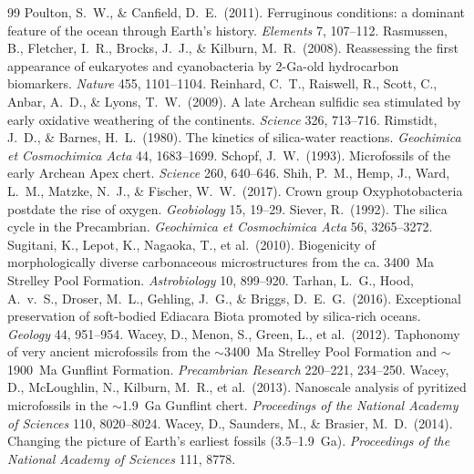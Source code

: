 \documentclass[11pt]{article}
\begin{document}
\begin{thebibliography}{99}
 Poulton, S.~W., \& Canfield, D.~E.\ (2011).
Ferruginous conditions: a dominant feature of the ocean through Earth's history. \textit{Elements} 7,
107--112.
 Rasmussen, B., Fletcher, I.~R., Brocks, J.~J., \&
Kilburn, M.~R.\ (2008). Reassessing the first appearance of eukaryotes and cyanobacteria by
2-Ga-old hydrocarbon biomarkers. \textit{Nature} 455, 1101--1104.
 Reinhard, C.~T., Raiswell, R., Scott, C., Anbar, A.~D.,
\& Lyons, T.~W.\ (2009). A late Archean sulfidic sea stimulated by early oxidative weathering of the
continents. \textit{Science} 326, 713--716.
 Rimstidt, J.~D., \& Barnes, H.~L.\ (1980). The
kinetics of silica-water reactions. \textit{Geochimica et Cosmochimica Acta} 44, 1683--1699.
 Schopf, J.~W.\ (1993). Microfossils of the early Archean Apex
chert. \textit{Science} 260, 640--646.
 Shih, P.~M., Hemp, J., Ward, L.~M., Matzke, N.~J., \& Fischer,
W.~W.\ (2017). Crown group Oxyphotobacteria postdate the rise of oxygen. \textit{Geobiology} 15,
19--29.
 Siever, R.\ (1992). The silica cycle in the Precambrian.
\textit{Geochimica et Cosmochimica Acta} 56, 3265--3272.
 Sugitani, K., Lepot, K., Nagaoka, T., et al.\ (2010).
Biogenicity of morphologically diverse carbonaceous microstructures from the ca. 3400~Ma Strelley
Pool Formation. \textit{Astrobiology} 10, 899--920.
 Tarhan, L.~G., Hood, A.~v.~S., Droser, M.~L., Gehling, J.~G.,
\& Briggs, D.~E.~G.\ (2016). Exceptional preservation of soft-bodied Ediacara Biota promoted by
silica-rich oceans. \textit{Geology} 44, 951--954.
 Wacey, D., Menon, S., Green, L., et al.\ (2012). Taphonomy of
very ancient microfossils from the $\sim$3400~Ma Strelley Pool Formation and $\sim$1900~Ma Gunflint
Formation. \textit{Precambrian Research} 220--221, 234--250.
 Wacey, D., McLoughlin, N., Kilburn, M.~R., et al.\ (2013).
Nanoscale analysis of pyritized microfossils in the $\sim$1.9~Ga Gunflint chert. \textit{Proceedings
of the National Academy of Sciences} 110, 8020--8024.
 Wacey, D., Saunders, M., \& Brasier, M.~D.\ (2014).
Changing the picture of Earth's earliest fossils (3.5--1.9~Ga). \textit{Proceedings of the National
Academy of Sciences} 111, 8778.
\end{thebibliography}
\end{document}
